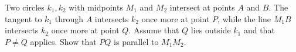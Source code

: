 Two circles $k_1,k_2$ with midpoints $M_1$ and $M_2$ intersect at points $A$ and $B$.
The tangent to $k_1$ through $A$ intersects $k_2$ once more at point $P$,
while the line $M_1B$ intersects $k_2$ once more at point $Q$.
Assume that $Q$ lies outside $k_1$ and that $P\neq Q$ applies.
Show that $PQ$ is parallel to $M_1M_2$.